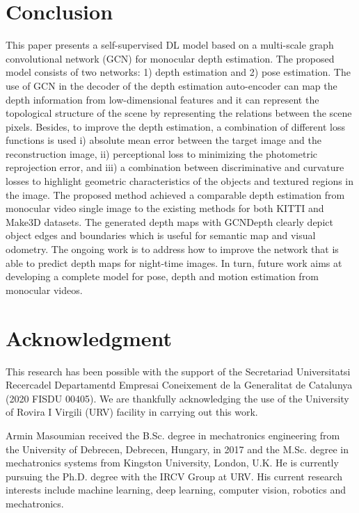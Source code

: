 \documentclass[journal]{IEEEtran}
\begin{document}
\section{Conclusion}
This paper presents a self-supervised DL model based on a multi-scale graph convolutional network (GCN) for monocular depth estimation. The proposed model consists of two networks: 1)  depth estimation and 2)  pose estimation. The use of GCN in the decoder of the depth estimation auto-encoder can map the depth information from low-dimensional features and it can represent the topological structure of the scene by representing the relations between the scene pixels. Besides, to improve the depth estimation, a combination of different loss functions is used i) absolute mean error between the target image and the reconstruction image, ii) perceptional loss to minimizing the photometric reprojection error, and iii)  a combination between discriminative and curvature losses to highlight geometric characteristics of the objects and textured regions in the image. The proposed method achieved a comparable depth estimation from monocular video single image to the existing methods for both KITTI and Make3D datasets. The generated depth maps with GCNDepth clearly depict object edges and boundaries which is useful for semantic map and visual odometry. The ongoing work is to address how to improve the network that is able to predict depth maps for night-time images. In turn, future work aims at developing a complete model for pose, depth and motion estimation from monocular videos.
\appendices
\section*{Acknowledgment}
This research has been possible with the support of the Secretariad Universitatsi Recercadel Departamentd Empresai Coneixement de la Generalitat de Catalunya (2020 FISDU 00405).
We are thankfully acknowledging the use of the University of Rovira I Virgili (URV) facility in carrying out this work. 


\begin{IEEEbiography}
{Armin Masoumian}
received the B.Sc. degree in mechatronics engineering from the University of Debrecen, Debrecen, Hungary, in 2017 and the M.Sc. degree in mechatronics systems from Kingston University, London, U.K. He is currently pursuing the Ph.D. degree with the IRCV Group at URV. His current research interests include machine learning, deep learning, computer vision, robotics and mechatronics.
\end{IEEEbiography}
\end{document}
